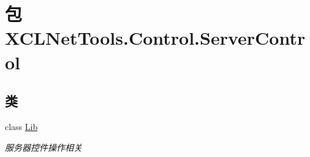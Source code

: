 \hypertarget{namespace_x_c_l_net_tools_1_1_control_1_1_server_control}{\section{包 X\-C\-L\-Net\-Tools.\-Control.\-Server\-Control}
\label{namespace_x_c_l_net_tools_1_1_control_1_1_server_control}
}
\subsection*{类}
\begin{DoxyCompactItemize}
\item 
class \hyperlink{class_x_c_l_net_tools_1_1_control_1_1_server_control_1_1_lib}{Lib}
\begin{DoxyCompactList}\small\item\em 服务器控件操作相关 \end{DoxyCompactList}\end{DoxyCompactItemize}
